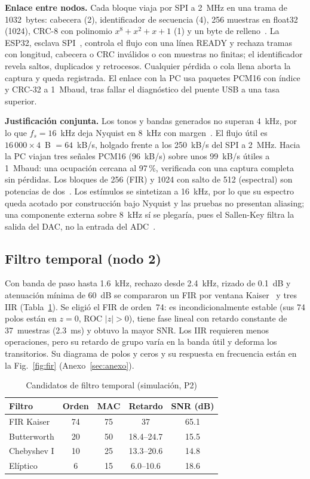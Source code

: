 \documentclass[conference]{IEEEtran}
\begin{document}
\textbf{Enlace entre nodos.} Cada bloque viaja por SPI a 2~MHz en una trama de
1032~bytes: cabecera (2), identificador de secuencia (4), 256 muestras en float32 (1024),
CRC-8 con polinomio $x^8+x^2+x+1$ (1) y un byte de relleno~\cite{peterson1961}. La
ESP32, esclava SPI~\cite{espidf}, controla el flujo con una línea READY y rechaza tramas
con longitud, cabecera o CRC inválidos o con muestras no finitas; el identificador
revela saltos, duplicados y retrocesos. Cualquier pérdida o cola llena aborta la
captura y queda registrada. El enlace con la PC usa paquetes PCM16 con índice y CRC-32 a
1~Mbaud, tras fallar el diagnóstico del puente USB a una tasa superior.

\textbf{Justificación conjunta.} Los tonos y bandas generados no superan 4~kHz, por lo que
$f_s=16$~kHz deja Nyquist en 8~kHz con margen~\cite{oppenheim2010}. El flujo útil es
$16\,000\times4$~B $=64$~kB/s, holgado frente a los 250~kB/s del SPI a 2~MHz. Hacia la
PC viajan tres señales PCM16 (96~kB/s) sobre unos 99~kB/s útiles a 1~Mbaud: una
ocupación cercana al 97\,\%, verificada con una captura completa sin pérdidas. Los bloques de 256 (FIR) y 1024
con salto de 512 (espectral) son potencias de dos~\cite{enunciado}.
Los estímulos se sintetizan a 16~kHz, por lo que su espectro queda acotado por
construcción bajo Nyquist y las pruebas no presentan aliasing; una componente externa
sobre 8~kHz sí se plegaría, pues el Sallen-Key filtra la salida del DAC, no la entrada
del ADC~\cite{oppenheim2010}.

\subsection{Filtro temporal (nodo 2)}
Con banda de paso hasta 1.6~kHz, rechazo desde 2.4~kHz, rizado de 0.1~dB y atenuación
mínima de 60~dB se compararon un FIR por ventana Kaiser~\cite{kaiser1974} y tres IIR
(Tabla~\ref{tab:filtros}). Se eligió el FIR de orden~74: es incondicionalmente estable
(sus 74 polos están en $z=0$, ROC $|z|>0$), tiene fase lineal con retardo constante de
37~muestras (2.3~ms) y obtuvo la mayor SNR. Los IIR requieren menos operaciones, pero
su retardo de grupo varía en la banda útil y deforma los transitorios. Su diagrama de polos y ceros y su respuesta en
frecuencia están en la Fig.~\ref{fig:fir} (Anexo~\ref{sec:anexo}).

\begin{table}[H]
\centering
\caption{Candidatos de filtro temporal (simulación, P2)}
\label{tab:filtros}
\begin{tabular}{lcccc}
\toprule
Filtro & Orden & MAC & Retardo & SNR (dB) \\
\midrule
FIR Kaiser & 74 & 75 & 37 & 65.1 \\
Butterworth & 20 & 50 & 18.4--24.7 & 15.5 \\
Chebyshev I & 10 & 25 & 13.3--20.6 & 14.8 \\
Elíptico & 6 & 15 & 6.0--10.6 & 18.6 \\
\bottomrule
\end{tabular}
\end{table}
\end{document}
